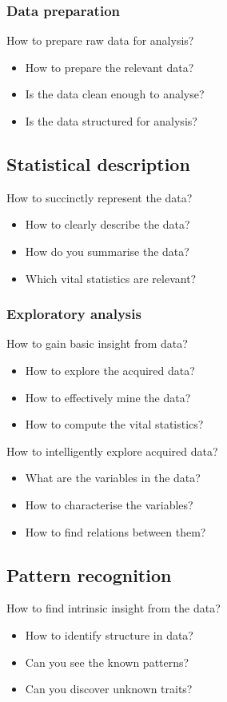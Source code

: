 \documentclass[11pt]{article}
\begin{document}
\subsubsection{Data preparation}
\label{sec:orga27018b}
How to prepare raw data for analysis?
\begin{itemize}
\item How to prepare the relevant data?
\item Is the data clean enough to analyse?
\item Is the data structured for analysis?
\end{itemize}
\subsection{Statistical description}
\label{sec:org60687d3}
How to succinctly represent the data?
\begin{itemize}
\item How to clearly describe the data?
\item How do you summarise the data?
\item Which vital statistics are relevant?
\end{itemize}
\subsubsection{Exploratory analysis}
\label{sec:org2ac88b8}
How to gain basic insight from data?
\begin{itemize}
\item How to explore the acquired data?
\item How to effectively mine the data?
\item How to compute the vital statistics?
\end{itemize}

How to intelligently explore acquired data?
\begin{itemize}
\item What are the variables in the data?
\item How to characterise the variables?
\item How to find relations between them?
\end{itemize}
\subsection{Pattern recognition}
\label{sec:org3b23bf3}
How to find intrinsic insight from the data?
\begin{itemize}
\item How to identify structure in data?
\item Can you see the known patterns?
\item Can you discover unknown traits?
\end{itemize}
\end{document}
